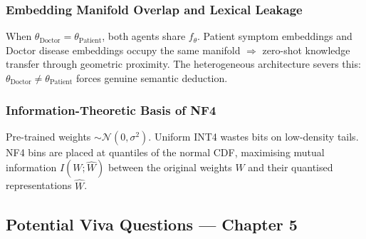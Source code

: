 \subsubsection{Embedding Manifold Overlap and Lexical Leakage}

When $\theta_{\text{Doctor}} = \theta_{\text{Patient}}$, both agents share $f_\theta$. Patient symptom embeddings and Doctor disease embeddings occupy the same manifold $\Rightarrow$ zero-shot knowledge transfer through geometric proximity. The heterogeneous architecture severs this: $\theta_{\text{Doctor}} \neq \theta_{\text{Patient}}$ forces genuine semantic deduction.

\subsubsection{Information-Theoretic Basis of NF4}

Pre-trained weights $\sim \mathcal{N}(0, \sigma^2)$. Uniform INT4 wastes bits on low-density tails. NF4 bins are placed at quantiles of the normal CDF, maximising mutual information $I(W; \hat{W})$ between the original weights $W$ and their quantised representations $\hat{W}$.

\subsection{Potential Viva Questions --- Chapter 5}

